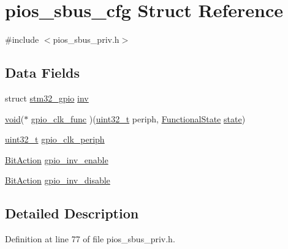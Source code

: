 \hypertarget{structpios__sbus__cfg}{\section{pios\-\_\-sbus\-\_\-cfg Struct Reference}
\label{structpios__sbus__cfg}
}


{\ttfamily \#include $<$pios\-\_\-sbus\-\_\-priv.\-h$>$}

\subsection*{Data Fields}
\begin{DoxyCompactItemize}
\item 
struct \hyperlink{structstm32__gpio}{stm32\-\_\-gpio} \hyperlink{structpios__sbus__cfg_af25f459d6167f8ba7a038ae53b458c46}{inv}
\item 
\hyperlink{group___n_a_m_e_ga18028b8badbf1ea7e704ccac3c488e82}{void}($\ast$ \hyperlink{structpios__sbus__cfg_a66cb660c4fe8979c218032c477b12a93}{gpio\-\_\-clk\-\_\-func} )(\hyperlink{stdint_8h_a435d1572bf3f880d55459d9805097f62}{uint32\-\_\-t} periph, \hyperlink{group___exported__types_gac9a7e9a35d2513ec15c3b537aaa4fba1}{Functional\-State} \hyperlink{posix_2posix_2pios__flashfs__logfs_8c_a13a6109e91ad12705df96a0f2743c630}{state})
\item 
\hyperlink{stdint_8h_a435d1572bf3f880d55459d9805097f62}{uint32\-\_\-t} \hyperlink{structpios__sbus__cfg_af2100d98daffabe98836f12519330975}{gpio\-\_\-clk\-\_\-periph}
\item 
\hyperlink{stm32f10x__gpio_8h_a176130b21c0e719121470a6042d4cf19}{Bit\-Action} \hyperlink{structpios__sbus__cfg_ab2b1ec166136b6e8ecfc96fa0c1319b5}{gpio\-\_\-inv\-\_\-enable}
\item 
\hyperlink{stm32f10x__gpio_8h_a176130b21c0e719121470a6042d4cf19}{Bit\-Action} \hyperlink{structpios__sbus__cfg_a843ec7deaae570eeab1dc5770e77dafe}{gpio\-\_\-inv\-\_\-disable}
\end{DoxyCompactItemize}


\subsection{Detailed Description}


Definition at line 77 of file pios\-\_\-sbus\-\_\-priv.\-h.



